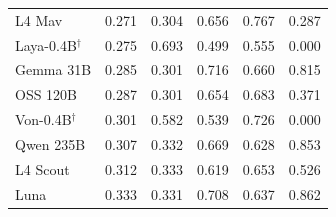 \begin{tabular}{lrrrrr}
L4 Mav & 0.271 & 0.304 & 0.656 & 0.767 & 0.287 \\
Laya-0.4B$^{\dagger}$ & 0.275 & 0.693 & 0.499 & 0.555 & 0.000 \\
Gemma 31B & 0.285 & 0.301 & 0.716 & 0.660 & 0.815 \\
OSS 120B & 0.287 & 0.301 & 0.654 & 0.683 & 0.371 \\
Von-0.4B$^{\dagger}$ & 0.301 & 0.582 & 0.539 & 0.726 & 0.000 \\
Qwen 235B & 0.307 & 0.332 & 0.669 & 0.628 & 0.853 \\
L4 Scout & 0.312 & 0.333 & 0.619 & 0.653 & 0.526 \\
Luna & 0.333 & 0.331 & 0.708 & 0.637 & 0.862 \\
\bottomrule
\end{tabular}
